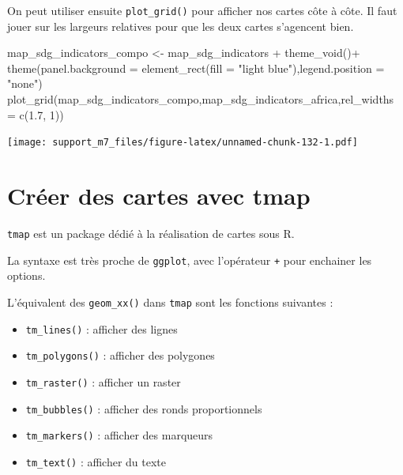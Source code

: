 \documentclass[
]{book}
\newenvironment{Shaded}{\begin{snugshade}}{\end{snugshade}}
\newcommand{\AttributeTok}[1]{\textcolor[rgb]{0.77,0.63,0.00}{#1}}
\newcommand{\DecValTok}[1]{\textcolor[rgb]{0.00,0.00,0.81}{#1}}
\newcommand{\FloatTok}[1]{\textcolor[rgb]{0.00,0.00,0.81}{#1}}
\newcommand{\FunctionTok}[1]{\textcolor[rgb]{0.00,0.00,0.00}{#1}}
\newcommand{\NormalTok}[1]{#1}
\newcommand{\OtherTok}[1]{\textcolor[rgb]{0.56,0.35,0.01}{#1}}
\newcommand{\SpecialCharTok}[1]{\textcolor[rgb]{0.00,0.00,0.00}{#1}}
\newcommand{\StringTok}[1]{\textcolor[rgb]{0.31,0.60,0.02}{#1}}
\providecommand{\tightlist}{%
  \setlength{\itemsep}{0pt}\setlength{\parskip}{0pt}}
\begin{document}
On peut utiliser ensuite \texttt{plot\_grid()} pour afficher nos cartes côte à côte. Il faut jouer sur les largeurs relatives pour que les deux cartes s'agencent bien.

\begin{Shaded}
\begin{Highlighting}[]
\NormalTok{map\_sdg\_indicators\_compo }\OtherTok{\textless{}{-}}\NormalTok{ map\_sdg\_indicators }\SpecialCharTok{+}
  \FunctionTok{theme\_void}\NormalTok{()}\SpecialCharTok{+}
  \FunctionTok{theme}\NormalTok{(}\AttributeTok{panel.background =} \FunctionTok{element\_rect}\NormalTok{(}\AttributeTok{fill =} \StringTok{"light blue"}\NormalTok{),}\AttributeTok{legend.position =} \StringTok{"none"}\NormalTok{)}
\FunctionTok{plot\_grid}\NormalTok{(map\_sdg\_indicators\_compo,map\_sdg\_indicators\_africa,}\AttributeTok{rel\_widths =} \FunctionTok{c}\NormalTok{(}\FloatTok{1.7}\NormalTok{, }\DecValTok{1}\NormalTok{))}
\end{Highlighting}
\end{Shaded}

\texttt{[image: support\_m7\_files/figure-latex/unnamed-chunk-132-1.pdf]}

\hypertarget{cruxe9er-des-cartes-avec-tmap}{%
\chapter{Créer des cartes avec tmap}\label{cruxe9er-des-cartes-avec-tmap}}

\texttt{tmap} est un package dédié à la réalisation de cartes sous R.

La syntaxe est très proche de \texttt{ggplot}, avec l'opérateur \texttt{+} pour enchainer les options.

L'équivalent des \texttt{geom\_xx()} dans \texttt{tmap} sont les fonctions suivantes :

\begin{itemize}
\tightlist
\item
  \texttt{tm\_lines()} : afficher des lignes
\item
  \texttt{tm\_polygons()} : afficher des polygones
\item
  \texttt{tm\_raster()} : afficher un raster
\item
  \texttt{tm\_bubbles()} : afficher des ronds proportionnels
\item
  \texttt{tm\_markers()} : afficher des marqueurs
\item
  \texttt{tm\_text()} : afficher du texte
\end{itemize}
\end{document}
